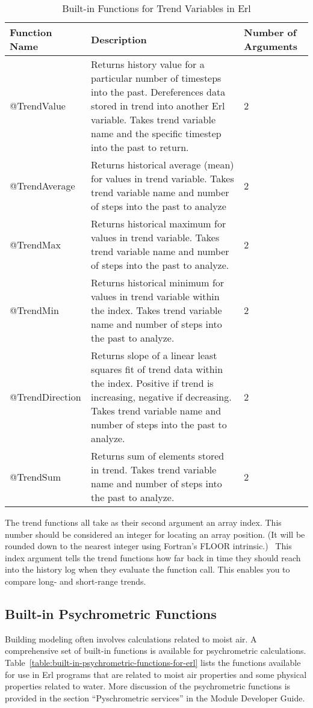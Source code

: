 \begin{longtable}[c]{p{1.5in}p{3.0in}p{1.5in}}
\caption{Built-in Functions for Trend Variables in Erl \protect \label{table:built-in-functions-for-trend-variables-in-erl}}\\
\toprule 
Function Name & Description & Number of Arguments \tabularnewline \midrule
\endhead
@TrendValue & Returns history value for a particular number of timesteps into the past. Dereferences data stored in trend into another Erl variable. Takes trend variable name and the specific timestep into the past to return. & 2 \tabularnewline
@TrendAverage & Returns historical average (mean) for values in trend variable. Takes trend variable name and number of steps into the past to analyze & 2 \tabularnewline
@TrendMax & Returns historical maximum for values in trend variable. Takes trend variable name and number of steps into the past to analyze. & 2 \tabularnewline
@TrendMin & Returns historical minimum for values in trend variable within the index. Takes trend variable name and number of steps into the past to analyze. & 2 \tabularnewline
@TrendDirection & Returns slope of a linear least squares fit of trend data within the index. Positive if trend is increasing, negative if decreasing. Takes trend variable name and number of steps into the past to analyze. & 2 \tabularnewline
@TrendSum & Returns sum of elements stored in trend. Takes trend variable name and number of steps into the past to analyze. & 2 \tabularnewline
\bottomrule
\end{longtable}

The trend functions all take as their second argument an array index. This number should be considered an integer for locating an array position. (It will be rounded down to the nearest integer using Fortran's FLOOR intrinsic.)~ This index argument tells the trend functions how far back in time they should reach into the history log when they evaluate the function call. This enables you to compare long- and short-range trends.

\subsection{Built-in Psychrometric Functions}\label{built-in-psychrometric-functions}

Building modeling often involves calculations related to moist air. A comprehensive set of built-in functions is available for psychrometric calculations. Table~\ref{table:built-in-psychrometric-functions-for-erl} lists the functions available for use in Erl programs that are related to moist air properties and some physical properties related to water. More discussion of the psychrometric functions is provided in the section ``Pyschrometric services'' in the Module Developer Guide.

